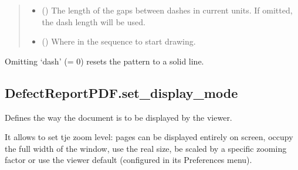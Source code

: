 \documentclass[letterpaper,10pt,english]{sphinxmanual}
\begin{document}
\begin{fulllineitems}
\begin{fulllineitems}
\begin{quote}
\begin{description}
\begin{itemize}
\item {} 
\sphinxAtStartPar
{} () \textendash{} The length of the gaps between dashes in current units.
If omitted, the dash length will be used.

\item {} 
\sphinxAtStartPar
{} () \textendash{} Where in the sequence to start drawing.

\end{itemize}

\end{description}\end{quote}

\sphinxAtStartPar
Omitting ‘dash’ (= 0) resets the pattern to a solid line.

\end{fulllineitems}



\subsection{DefectReportPDF.set\_display\_mode}
\label{\detokenize{generated/quality_assessment.quality_pdf_report.DefectReportPDF.set_display_mode:defectreportpdf-set-display-mode}}\label{\detokenize{generated/quality_assessment.quality_pdf_report.DefectReportPDF.set_display_mode::doc}}

\begin{fulllineitems}
\label{\detokenize{generated/quality_assessment.quality_pdf_report.DefectReportPDF.set_display_mode:quality_assessment.quality_pdf_report.DefectReportPDF.set_display_mode}}
\sphinxAtStartPar
Defines the way the document is to be displayed by the viewer.

\sphinxAtStartPar
It allows to set tje zoom level: pages can be displayed entirely on screen,
occupy the full width of the window, use the real size,
be scaled by a specific zooming factor or use the viewer default (configured in its Preferences menu).


\end{fulllineitems}
\end{fulllineitems}
\end{document}
